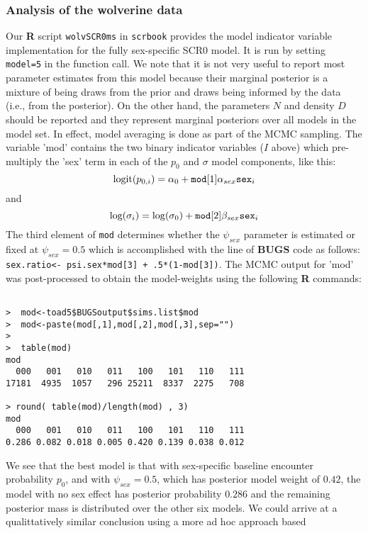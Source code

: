 \subsubsection{Analysis of the wolverine data}

Our {\bf R} script \mbox{\tt wolvSCR0ms} in \mbox{\tt scrbook}
provides the model indicator variable implementation for the fully
sex-specific SCR0 model.  It is run by setting \mbox{\tt model=5} in
the function call. We note that it is not very useful to report most
parameter estimates from this model because their marginal posterior
is a mixture of being draws from the prior and draws being informed by
the data (i.e., from the posterior). On the other hand, the parameters
$N$ and density $D$ should be reported and they represent marginal
posteriors over all models in the model set. In effect, model
averaging is done as part of the MCMC sampling.  The variable 'mod'
contains the two binary indicator variables ($I$ above) which
pre-multiply the 'sex' term in each of the $p_{0}$ and $\sigma$ model
components, like this:
\[
 \mbox{logit}(p_{0,i}) = \alpha_{0} + \mbox{\tt mod}[1] \alpha_{sex} \mbox{\tt sex}_{i}
\]
and
\[
 \mbox{log}(\sigma_{i}) = \log(\sigma_{0}) + \mbox{\tt mod}[2] \beta_{sex} \mbox{\tt sex}_{i}
\]
The third element of \mbox{\tt mod} determines whether the
$\psi_{sex}$ parameter is estimated or fixed at $\psi_{sex} =
0.5$ which is accomplished with the line of {\bf BUGS} code as follows:
\mbox{\tt sex.ratio<- psi.sex*mod[3] + .5*(1-mod[3])}.
The MCMC output for 'mod' was post-processed to obtain the
model-weights using the following  {\bf R} commands:
\begin{verbatim}

>  mod<-toad5$BUGSoutput$sims.list$mod
>  mod<-paste(mod[,1],mod[,2],mod[,3],sep="")
>
>  table(mod)
mod
  000   001   010   011   100   101   110   111
17181  4935  1057   296 25211  8337  2275   708

> round( table(mod)/length(mod) , 3)
mod
  000   001   010   011   100   101   110   111
0.286 0.082 0.018 0.005 0.420 0.139 0.038 0.012

\end{verbatim}
We see that the best model is that with sex-specific baseline
encounter probability $p_{0}$, and with $\psi_{sex} = 0.5$, which has
posterior model weight of $0.42$, the model with no sex effect has
posterior probability $0.286$ and the remaining posterior mass is
distributed over the other six models. We could arrive at a
qualittatively similar conclusion using a more ad hoc approach based
